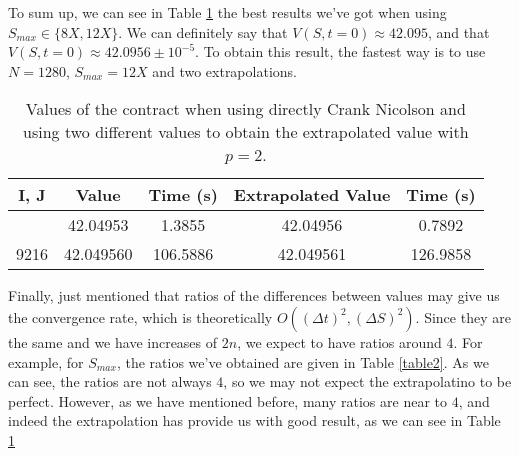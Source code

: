To sum up, we can see in Table \ref{table4} the best results we've got when using $S_{max}\in\{8X,12X\}$. We can definitely say that $V(S,t=0) \approx 42.095$, and that $V(S,t=0) \approx 42.0956\pm 10^{-5}$. To obtain this result, the fastest way is to use $N=1280$, $S_{max} = 12X$ and two extrapolations.
\begin{table}[h!]
	\setlength{\tabcolsep}{12pt}
	\renewcommand{\arraystretch}{1.25}
	\begin{tabular}{c||cc||cc}
		 I, J		&  	Value & Time (s)& Extrapolated Value& Time (s)\\\hline\addlinespace[0.05cm]
		952 	& 	42.04953 & 1.3855&42.04956 	& 0.7892 \\
		9216 	&	42.049560& 106.5886&42.049561 	& 126.9858 \\
	\end{tabular}
\vspace{0.25cm}
	\captionsetup{width=.639\linewidth}
	\caption{Values of the contract when using directly Crank Nicolson and using two different values to obtain the extrapolated value with $p=2$.}\label{table4}
\end{table}
\vspace{-0.5cm}
Finally, just mentioned that ratios of the differences between values may give us the convergence rate, which is theoretically $O((\Delta t)^2, (\Delta S)^2)$. Since they are the same and we have increases of $2n$, we expect to have ratios around $4$. For example, for $S_{max}$, the ratios we've obtained are given in Table \ref{table2}. As we can see, the ratios are not always $4$, so we may not expect the extrapolatino to be perfect. However, as we have mentioned before, many ratios are near to $4$, and indeed the extrapolation has provide us with good result, as we can see in Table \ref{table4}
